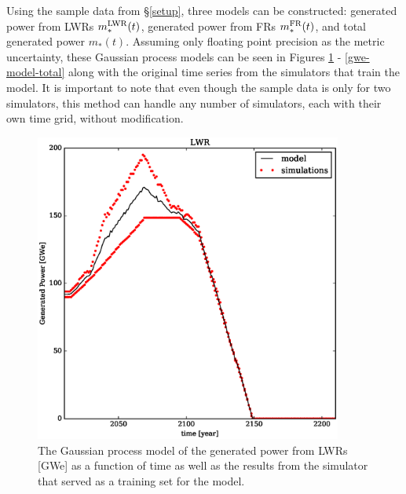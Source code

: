 Using the sample data from \S\ref{setup}, three models can be constructed:
generated power from LWRs $m_*^{\mathrm{LWR}}(t)$, generated power from FRs $m_*^{\mathrm{FR}}(t)$, 
and total generated power $m_*(t)$. Assuming only floating point precision as 
the metric uncertainty, these Gaussian process models can be seen in Figures 
\ref{gwe-model-lwr} - \ref{gwe-model-total} along with the original time series 
from the simulators that train the model.
It is important to note that even though the sample data is only for two simulators, 
this method can handle any number of simulators, each with their own time grid, 
without modification.

\begin{figure}[htb]
\centering
\includegraphics[width=0.9\textwidth]{gwe-model-lwr.eps}
\caption{The Gaussian process model of the generated power from LWRs [GWe] 
as a function of time as well as the results from the simulator that served as a 
training set for the model.}
\label{gwe-model-lwr}
\end{figure}

